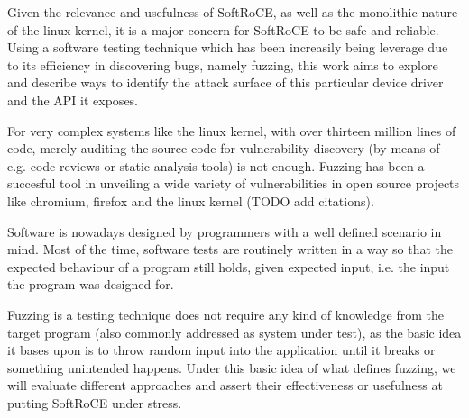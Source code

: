 
Given the relevance and usefulness of SoftRoCE, as well as the monolithic nature of the linux kernel,
it is a major concern for SoftRoCE to be safe and reliable.
Using a software testing technique which has been increasily being leverage due to its efficiency in
discovering bugs, namely fuzzing, this work aims to explore and describe ways to identify the attack surface
of this particular device driver and the API it exposes.

For very complex systems like the linux kernel, with over thirteen million lines of code, merely auditing the
source code for vulnerability discovery (by means of e.g. code reviews or static analysis tools) is not enough.
Fuzzing has been a succesful tool in unveiling a wide variety of vulnerabilities in open source projects like chromium,
firefox and the linux kernel (TODO add citations).

Software is nowadays designed by programmers with a well defined scenario in mind. Most of the time, software tests
are routinely written in a way so that the expected behaviour of a program still holds, given expected input, i.e. the input
the program was designed for.

Fuzzing is a testing technique does not require any kind of knowledge from the target program (also commonly addressed as system under test),
as the basic idea it bases upon is to throw random input into the application until it breaks or something unintended happens. Under
this basic idea of what defines fuzzing, we will evaluate different approaches and assert their effectiveness or usefulness
at putting SoftRoCE under stress.
